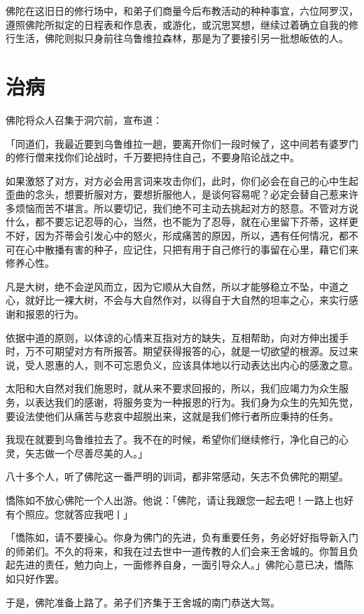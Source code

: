 \documentclass[twoside,openany]{book}
\begin{document}
佛陀在这旧日的修行场中，和弟子们商量今后布教活动的种种事宜，六位阿罗汉，遵照佛陀所拟定的日程表和作息表，或游化，或沉思冥想，继续过着确立自我的修行生活，佛陀则拟只身前往乌鲁维拉森林，那是为了要接引另一批想皈依的人。

\section{治病}\label{sec3.3}

佛陀将众人召集于洞穴前，宣布道：

「同道们，我最近要到乌鲁维拉一趟，要离开你们一段时候了，这中间若有婆罗门的修行僧来找你们论战时，千万要把持住自己，不要身陷论战之中。

如果激怒了对方，对方必会用言词来攻击你们，此时，你们必会在自己的心中生起歪曲的念头，想要折服对方，要想折服他人，是谈何容易呢？必定会替自己惹来许多烦恼而苦不堪言。所以要切记，我们绝不可主动去挑起对方的怒意。不管对方说什么，都不要忘记忍辱的心，当然，也不能为了忍辱，就在心里留下芥蒂，这样更不好，因为芥蒂会引发心中的怒火，形成痛苦的原因，所以，遇有任何情况，都不可在心中散播有害的种子，应记住，只把有用于自己修行的事留在心里，藉它们来修养心性。

凡是大树，绝不会逆风而立，因为它顺从大自然，所以才能够稳立不坠，中道之心，就好比一裸大树，不会与大自然作对，以得自于大自然的坦率之心，来实行感谢和报恩的行为。

依据中道的原则，以体谅的心情来互指对方的缺失，互相帮助，向对方伸出援手时，万不可期望对方有所报答。期望获得报答的心，就是一切欲望的根源。反过来说，受人恩惠的人，则不可忘恩负义，应该具体地以行动表达出内心的感激之意。

太阳和大自然对我们施恩时，就从来不要求回报的，所以，我们应竭力为众生服务，以表达我们的感谢，将服务变为一种报恩的行为。我们身为众生的先知先觉，要设法使他们从痛苦与悲哀中超脱出来，这就是我们修行者所应秉持的任务。

我现在就要到乌鲁维拉去了。我不在的时候，希望你们继续修行，净化自己的心灵，矢志做一个尽善尽美的人。」

八十多个人，听了佛陀这一番严明的训词，都非常感动，矢志不负佛陀的期望。

憍陈如不放心佛陀一个人出游。他说：「佛陀，请让我跟您一起去吧！一路上也好有个照应。您就答应我吧丨」

「憍陈如，请不要操心。你身为佛门的先进，负有重要任务，务必好好指导新入门的师弟们。不久的将来，和我在过去世中一道传教的人们会来王舍城的。你暂且负起先进的责任，勉力向上，一面修养自身，一面引导众人。」佛陀心意已决，憍陈如只好作罢。

于是，佛陀准备上路了。弟子们齐集于王舍城的南门恭送大驾。
\end{document}
